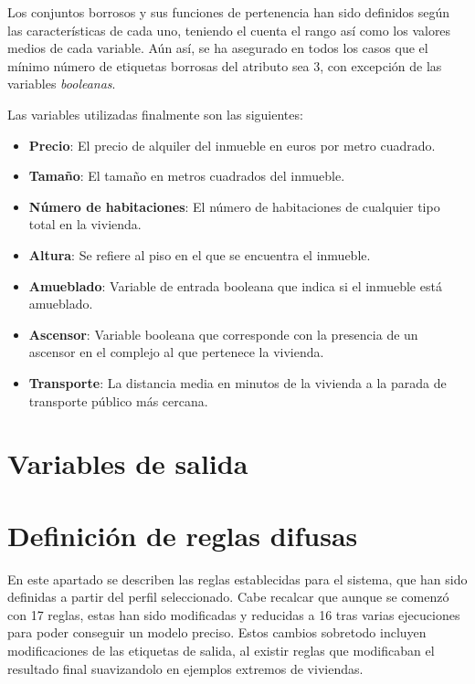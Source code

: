 \documentclass[12pt]{report} %
\begin{document}
        Los conjuntos borrosos y sus funciones de pertenencia han sido
        definidos según las características de cada uno, teniendo el cuenta el
        rango así como los valores medios de cada variable. Aún así, se ha
        asegurado en todos los casos que el mínimo número de etiquetas borrosas del
        atributo sea 3, con excepción de las variables \textit{booleanas}.

        Las variables utilizadas finalmente son las siguientes: 
        \begin{itemize}
            \item \textbf{Precio}: El precio de alquiler del inmueble en euros por metro cuadrado.

            \item \textbf{Tamaño}: El tamaño en metros cuadrados del inmueble. 
            
            \item \textbf{Número de habitaciones}: El número de habitaciones de cualquier tipo total en la vivienda. 

            \item \textbf{Altura}: Se refiere al piso en el que se encuentra el inmueble.
            
            \item \textbf{Amueblado}: Variable de entrada booleana que indica si el inmueble está amueblado.
            
            \item \textbf{Ascensor}: Variable booleana que corresponde con la presencia de un ascensor en el complejo al que pertenece la vivienda. 

            \item \textbf{Transporte}: La distancia media en minutos de la vivienda a la parada de transporte público más cercana.
        \end{itemize}

    \section{Variables de salida}


    \section{Definición de reglas difusas}
    En este apartado se describen las reglas establecidas para el sistema, que han sido definidas a partir del perfil seleccionado. Cabe recalcar que aunque se comenzó con 17 reglas,
    estas han sido modificadas y reducidas a 16 tras varias ejecuciones para poder conseguir un modelo preciso. Estos cambios sobretodo incluyen modificaciones de las etiquetas de salida,
    al existir reglas que modificaban el resultado final suavizandolo en ejemplos extremos de viviendas. 
\end{document}
